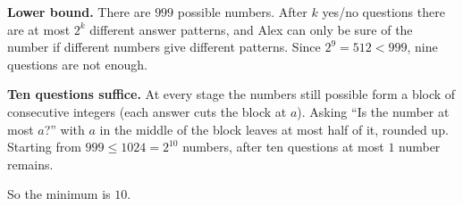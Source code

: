 \textbf{Lower bound.} There are $999$ possible numbers. After $k$ yes/no questions there are at most $2^k$ different answer patterns, and Alex can only be sure of the number if different numbers give different patterns. Since $2^9=512<999$, nine questions are not enough.

\textbf{Ten questions suffice.} At every stage the numbers still possible form a block of consecutive integers (each answer cuts the block at $a$). Asking ``Is the number at most $a$?'' with $a$ in the middle of the block leaves at most half of it, rounded up. Starting from $999\le1024=2^{10}$ numbers, after ten questions at most $1$ number remains.

So the minimum is $\boxed{10}$.
